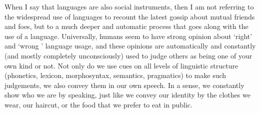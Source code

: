%
When I say that languages are also social instruments, then I am not referring to the widespread use of languages to recount the latest gossip about mutual friends and foes, but to a much deeper and automatic process that goes along with the use of a language. Universally, humans seem to have strong opinion about `right' and `wrong ' language usage, and these opinions are automatically and constantly (and mostly completely unconsciously) used to judge others as being one of your own kind or not. Not only do we use cues on all levels of linguistic structure (phonetics, lexicon, morphosyntax, semantics, pragmatics) to make such judgements, we also convey them in our own speech. In a sense, we constantly show who we are by speaking, just like we convey our identity by the clothes we wear, our haircut, or the food that we prefer to eat in public.








